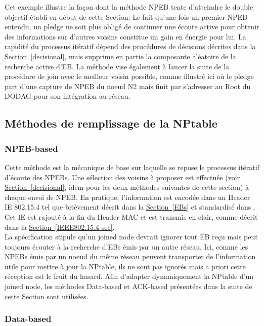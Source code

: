 \documentclass[]{report}
\newcommand{\wordlink}[2]{\hyperref[#2]{#1~\ref{#2}}}
\begin{document}
Cet exemple illustre la façon dont la méthode NPEB tente d'atteindre le double objectif établi en début de cette Section. Le fait qu'une fois un premier NPEB entendu, un pledge ne soit plus obligé de continuer une écoute active pour obtenir des informations sur d'autres voisins constitue un gain en énergie pour lui. La rapidité du processus itératif dépend des procédures de décisions décrites dans la \wordlink{Section}{decisional}, mais supprime en partie la composante aléatoire de la recherche active d'EB. La méthode vise également à lancer la suite de la procédure de join avec le meilleur voisin possible, comme illustré ici  où le pledge part d'une capture de NPEB du noeud N2 mais finit par s'adresser au Root du DODAG pour son intégration au réseau.

\subsection{Méthodes de remplissage de la NPtable}
\label{feed_NPtable}

\subsubsection{NPEB-based}

Cette méthode est la mécanique de base sur laquelle se repose le processus itératif d'écoute des NPEBs. Une sélection des voisins à proposer est effectuée (voir \wordlink{Section}{decisional}, idem pour les deux méthodes suivantes de cette section) à chaque envoi de NPEB. En pratique, l'information est encodée dans un Header IE 802.15.4 tel que brièvement décrit dans la \wordlink{Section}{EBs} et standardisé dans \cite{IEEE802.15.4}. Cet IE est rajouté à la fin du Header MAC et est transmis en clair, comme décrit dans la \wordlink{Section}{IEEE802.15.4-sec}.\\

La spécification \cite{rfc8180} stipule qu'un joined node devrait ignorer tout EB reçu mais peut toujours écouter à la recherche d'EBs émis par un autre réseau. Ici, comme les NPEBs émis par un noeud du même réseau peuvent transporter de l'information utile pour mettre à jour la NPtable, ils ne sont pas ignorés mais a priori cette réception est le fruit du hasard. Afin d'adapter dynamiquement la NPtable d'un joined node, les méthodes Data-based et ACK-based présentées dans la suite de cette Section sont utilisées.

\subsubsection{Data-based}
\end{document}
